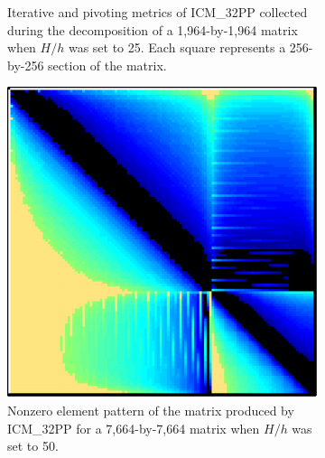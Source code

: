 \begin{figure}[ht!]
\begin{subfigure}[t]{0.51\textwidth}
		\caption{Iterative and pivoting metrics of ICM\_32PP collected during the decomposition of a 1,964-by-1,964 matrix when $H/h$ was set to 25. Each square represents a 256-by-256 section of the matrix.}
		\label{Figure:comparing-decomposers-and-solvers->bddcml-benchmark->benchmark-results->speedup-comparison-of-decomposers-in-pc-setup-stage->speedup-comparison->ICM_32PP->25-4-2->metrics}
	\end{subfigure}
	
	\begin{subfigure}[t]{0.45\textwidth}
		\centering
		\includegraphics[width=\textwidth]{images/ch03/input-matrices/bddcml-benchmark/poc-50_4_2-LU_ICM32PP.pdf}
		\caption{Nonzero element pattern of the  matrix produced by ICM\_32PP for a 7,664-by-7,664 matrix when $H/h$ was set to 50.}
		\label{Figure:comparing-decomposers-and-solvers->bddcml-benchmark->benchmark-results->speedup-comparison-of-decomposers-in-pc-setup-stage->speedup-comparison->ICM_32PP->50-4-2->LU}
	\end{subfigure}%
	\hspace{0.03\textwidth}
	\begin{subfigure}[t]{0.51\textwidth}
		\centering

\end{subfigure}
\end{figure}
